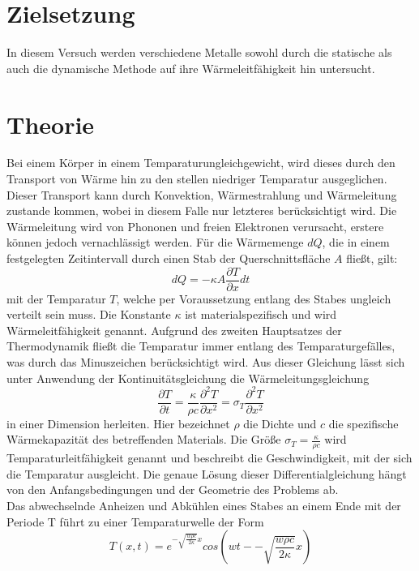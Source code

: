 \section{Zielsetzung}
In diesem Versuch werden verschiedene Metalle sowohl durch die statische als auch die dynamische Methode auf ihre Wärmeleitfähigkeit hin untersucht.
\section{Theorie}
Bei einem Körper in einem Temparaturungleichgewicht, wird dieses durch den Transport von Wärme hin zu den stellen niedriger Temparatur ausgeglichen. Dieser Transport kann durch Konvektion, Wärmestrahlung und Wärmeleitung zustande kommen, wobei in diesem Falle nur letzteres berücksichtigt wird. Die Wärmeleitung wird von Phononen und freien Elektronen verursacht, erstere können jedoch vernachlässigt werden. Für die Wärmemenge $dQ$, die in einem festgelegten Zeitintervall durch einen Stab der Querschnittsfläche $A$ fließt, gilt:
\begin{equation}
dQ=-\kappa A \frac{\partial T}{\partial x}dt
\end{equation}
mit der Temparatur $T$, welche per Voraussetzung entlang des Stabes ungleich verteilt sein muss. Die Konstante $\kappa$ ist materialspezifisch und wird Wärmeleitfähigkeit genannt. Aufgrund des zweiten Hauptsatzes der Thermodynamik fließt die Temparatur immer entlang des Temparaturgefälles, was durch das Minuszeichen berücksichtigt wird. Aus dieser Gleichung lässt sich unter Anwendung der Kontinuitätsgleichung die Wärmeleitungsgleichung 
\begin{equation}
\frac{\partial T}{\partial t}=\frac{\kappa}{\rho c} \frac{\partial^2 T}{\partial x^2}=\sigma_T \frac{\partial^2 T}{\partial x^2} 
\end{equation}
in einer Dimension herleiten. Hier bezeichnet $\rho$ die Dichte und $c$ die spezifische Wärmekapazität des betreffenden Materials. Die Größe $\sigma_T=\frac{\kappa}{\rho c}$ wird Temparaturleitfähigkeit genannt und beschreibt die Geschwindigkeit, mit der sich die Temparatur ausgleicht. Die genaue Lösung dieser Differentialgleichung hängt von den Anfangsbedingungen und der Geometrie des Problems ab. \\
Das abwechselnde Anheizen und Abkühlen eines Stabes an einem Ende mit der Periode T führt zu einer Temparaturwelle der Form
\begin{equation}
T(x,t)=e^{-\sqrt{\frac{w\rho c}{2\kappa}}x}cos(wt--\sqrt{\frac{w\rho c}{2\kappa}}x)
\end{equation}
